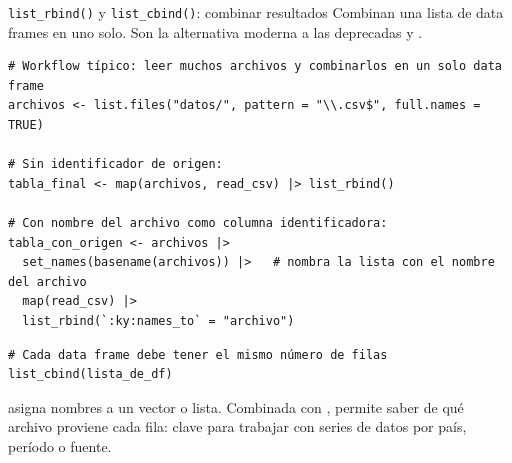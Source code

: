 \documentclass[8pt]{beamer}
\begin{document}
	\begin{frame}[fragile]{\texttt{list\_rbind()} y \texttt{list\_cbind()}: combinar resultados}
		Combinan una lista de data frames en uno solo. Son la alternativa moderna a las deprecadas  y .

\begin{lstlisting}[style=RScript]
# Workflow típico: leer muchos archivos y combinarlos en un solo data frame
archivos <- list.files("datos/", pattern = "\\.csv$", full.names = TRUE)

# Sin identificador de origen:
tabla_final <- map(archivos, read_csv) |> list_rbind()

# Con nombre del archivo como columna identificadora:
tabla_con_origen <- archivos |>
  set_names(basename(archivos)) |>   # nombra la lista con el nombre del archivo
  map(read_csv) |>
  list_rbind(`:ky:names_to` = "archivo")
\end{lstlisting}


\begin{lstlisting}[style=RScript]
# Cada data frame debe tener el mismo número de filas
list_cbind(lista_de_df)
\end{lstlisting}

		\begin{exampleblock}{}
			 asigna nombres a un vector o lista. Combinada con , permite saber de qué archivo proviene cada fila: clave para trabajar con series de datos por país, período o fuente.
		\end{exampleblock}
	\end{frame}
\end{document}
